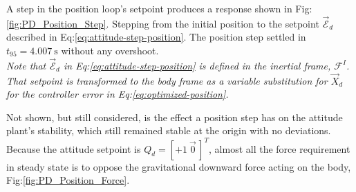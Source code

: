A step in the position loop's setpoint produces a response shown in Fig:\ref{fig:PD_Position_Step}. Stepping from the initial position to the setpoint $\vec{\mathcal{E}}_d$ described in Eq:\ref{eq:attitude-step-position}. The position step settled in $t_{95}=4.007~\text{s}$ without any overshoot. 
\\
\emph{\color{Gray}Note that $\vec{\mathcal{E}}_d$ in Eq:\ref{eq:attitude-step-position} is defined in the inertial frame, $\mathcal{F}^{I}$. That setpoint is transformed to the body frame as a variable substitution for $\vec{X}_d$ for the controller error in Eq:\ref{eq:optimized-position}.}
\par
Not shown, but still considered, is the effect a position step has on the attitude plant's stability, which still remained stable at the origin with no deviations. Because the attitude setpoint is $Q_d=[+1~\vec{0}\hspace{2pt}]^T$, almost all the force requirement in steady state is to oppose the gravitational downward force acting on the body, Fig:\ref{fig:PD_Position_Force}.
